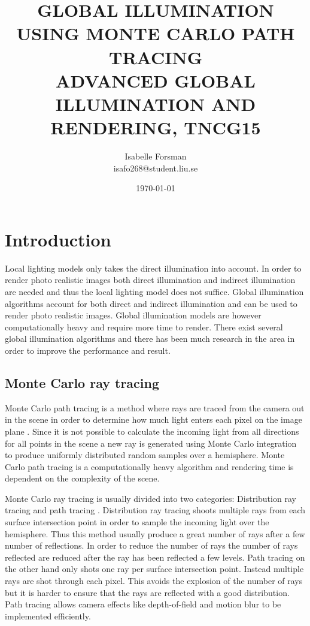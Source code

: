 \documentclass[twocolumn]{article}
\title{GLOBAL ILLUMINATION USING MONTE CARLO PATH TRACING \\ {\small\vspace{-1.0em} ADVANCED GLOBAL ILLUMINATION AND RENDERING, TNCG15}}
\author{Isabelle Forsman\\isafo268@student.liu.se}
\date{\today}
\begin{document}
\maketitle

\begin{abstract}

\end{abstract}


\section{Introduction}
Local lighting models only takes the direct illumination into account. In order to render photo realistic images both direct illumination and indirect illumination are needed and thus the local lighting model does not suffice. Global illumination algorithms account for both direct and indirect illumination and can be used to render photo realistic images. Global illumination models are however computationally heavy and require more time to render. There exist several global illumination algorithms and there has been much research in the area in order to improve the performance and result.

\subsection{Monte Carlo ray tracing}
Monte Carlo path tracing is a method where rays are traced from the camera out in the scene in order to determine how much light enters each pixel on the image plane \cite{CG:PP}. Since it is not possible to calculate the incoming light from all directions for all points in the scene a new ray is generated using Monte Carlo integration to produce uniformly distributed random samples over a hemisphere. Monte Carlo path tracing is a computationally heavy algorithm and rendering time is dependent on the complexity of the scene.

Monte Carlo ray tracing is usually divided into two categories: Distribution ray tracing and path tracing \cite{hq}. Distribution ray tracing shoots multiple rays from each surface intersection point in order to sample the incoming light over the hemisphere. Thus this method usually produce a great number of rays after a few number of reflections. In order to reduce the number of rays the number of rays reflected are reduced after the ray has been reflected a few levels. Path tracing on the other hand only shots one ray per surface intersection point. Instead multiple rays are shot through each pixel. This avoids the explosion of the number of rays but it is harder to ensure that the rays are reflected with a good distribution. Path tracing allows camera effects like depth-of-field and motion blur to be implemented efficiently.
\end{document}
